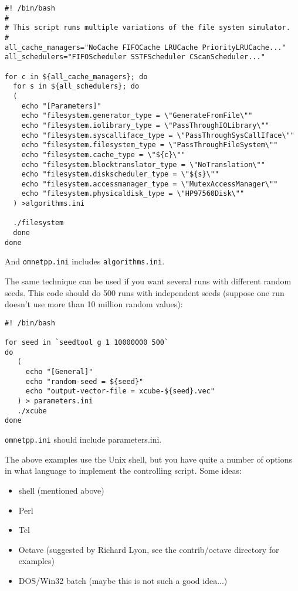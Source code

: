 \begin{Verbatim}
#! /bin/bash
#
# This script runs multiple variations of the file system simulator.
#
all_cache_managers="NoCache FIFOCache LRUCache PriorityLRUCache..."
all_schedulers="FIFOScheduler SSTFScheduler CScanScheduler..."

for c in ${all_cache_managers}; do 
  for s in ${all_schedulers}; do 
  ( 
    echo "[Parameters]" 
    echo "filesystem.generator_type = \"GenerateFromFile\"" 
    echo "filesystem.iolibrary_type = \"PassThroughIOLibrary\"" 
    echo "filesystem.syscalliface_type = \"PassThroughSysCallIface\"" 
    echo "filesystem.filesystem_type = \"PassThroughFileSystem\"" 
    echo "filesystem.cache_type = \"${c}\"" 
    echo "filesystem.blocktranslator_type = \"NoTranslation\"" 
    echo "filesystem.diskscheduler_type = \"${s}\"" 
    echo "filesystem.accessmanager_type = \"MutexAccessManager\"" 
    echo "filesystem.physicaldisk_type = \"HP97560Disk\"" 
  ) >algorithms.ini

  ./filesystem 
  done
done
\end{Verbatim}

And \texttt{omnetpp.ini} includes \texttt{algorithms.ini}.




The same technique can be used if you want several runs with different
random seeds. This code should do 500 runs with
independent seeds (suppose one run doesn't use more than 10 million
random values):

\begin{Verbatim}
#! /bin/bash

for seed in `seedtool g 1 10000000 500`
do
   (
     echo "[General]"
     echo "random-seed = ${seed}"
     echo "output-vector-file = xcube-${seed}.vec"
   ) > parameters.ini
   ./xcube
done
\end{Verbatim}


\texttt{omnetpp.ini} should include parameters.ini.




The above examples use the Unix shell, but you have quite a number 
of options in what language to implement the controlling script. 
Some ideas:
\begin{itemize}
  \item{shell (mentioned above)}
  \item{Perl}
  \item{Tcl}
  \item{Octave (suggested by Richard Lyon, see the contrib/octave
    directory for examples)}
  \item{DOS/Win32 batch (maybe this is not such a good idea...)}
\end{itemize}






